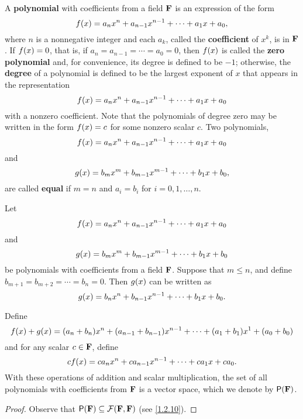 \begin{defn}\label{1.2.11}
    A \textbf{polynomial} with coefficients from a field \(\mathbf{F}\) is an expression of the form
    \[
        f\p{x} = a_{n} x^{n} + a_{n - 1} x^{n - 1} + \cdots + a_{1} x + a_{0},
    \]
    where \(n\) is a nonnegative integer and each \(a_{k}\), called the \textbf{coefficient} of \(x^{k}\), is in \(\mathbf{F}\).
    If \(f\p{x} = 0\), that is, if \(a_{n} = a_{n - 1} = \cdots = a_{0} = 0\), then \(f\p{x}\) is called the \textbf{zero polynomial} and, for convenience, its degree is defined to be \(-1\);
    otherwise, the \textbf{degree} of a polynomial is defined to be the largest exponent of \(x\) that appears in the representation
    \[
        f\p{x} = a_{n} x^{n} + a_{n - 1} x^{n - 1} + \cdots + a_{1} x + a_{0}
    \]
    with a nonzero coefficient.
    Note that the polynomials of degree zero may be written in the form \(f\p{x} = c\) for some nonzero scalar \(c\).
    Two polynomials,
    \[
        f\p{x} = a_{n} x^{n} + a_{n - 1} x^{n - 1} + \cdots + a_{1} x + a_{0}
    \]
    and
    \[
        g\p{x} = b_{m} x^{m} + b_{m - 1} x^{m - 1} + \cdots + b_{1} x + b_{0},
    \]
    are called \textbf{equal} if \(m = n\) and \(a_i = b_i\) for \(i = 0, 1, \dots, n\).
\end{defn}

\begin{eg}\label{1.2.12}
    Let
    \[
        f\p{x} = a_{n} x^{n} + a_{n - 1} x^{n - 1} + \cdots + a_{1} x + a_{0}
    \]
    and
    \[
        g\p{x} = b_{m} x^{m} + b_{m - 1} x^{m - 1} + \cdots + b_{1} x + b_{0}
    \]
    be polynomials with coefficients from a field \(\mathbf{F}\).
    Suppose that \(m \leq n\), and define \(b_{m + 1} = b_{m + 2} = \cdots = b_{n} = 0\).
    Then \(g\p{x}\) can be written as
    \[
        g\p{x} = b_{n} x^{n} + b_{n - 1} x^{n - 1} + \cdots + b_{1} x + b_{0}.
    \]

    Define
    \[
        f\p{x} + g\p{x} = \p{a_{n} + b_{n}} x^{n} + \p{a_{n - 1} + b_{n - 1}} x^{n - 1} + \cdots + \p{a_{1} + b_{1}} x^{1} + \p{a_{0} + b_{0}}
    \]
    and for any scalar \(c \in \mathbf{F}\), define
    \[
        cf\p{x} = ca_{n} x^{n} + ca_{n - 1} x^{n - 1} + \cdots + ca_{1} x + ca_{0}.
    \]
    With these operations of addition and scalar multiplication, the set of all polynomials with coefficients from \(\mathbf{F}\) is a vector space, which we denote by \(\ps{\F}\).
\end{eg}

\begin{proof}
    Observe that \(\ps{\F} \subseteq \mathcal{F}\p{\F, \F}\) (see \cref{1.2.10}).
\end{proof}


